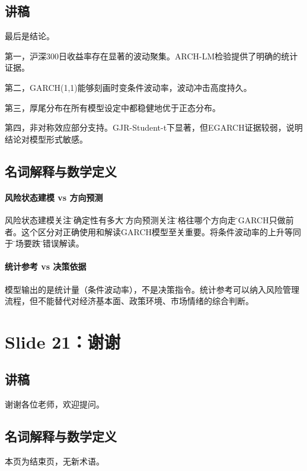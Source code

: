 \documentclass[11pt,a4paper]{article}
\begin{document}
\subsection*{讲稿}
最后是结论。

第一，沪深300日收益率存在显著的波动聚集。ARCH-LM检验提供了明确的统计证据。

第二，GARCH(1,1)能够刻画时变条件波动率，波动冲击高度持久。

第三，厚尾分布在所有模型设定中都稳健地优于正态分布。

第四，非对称效应部分支持。GJR-Student-t下显著，但EGARCH证据较弱，说明结论对模型形式敏感。

\subsection*{名词解释与数学定义}

\paragraph{风险状态建模 vs 方向预测} 风险状态建模关注\"不确定性有多大\"，方向预测关注\"价格往哪个方向走\"。GARCH只做前者。这个区分对正确使用和解读GARCH模型至关重要。将条件波动率的上升等同于\"市场要跌\"是错误解读。

\paragraph{统计参考 vs 决策依据} 模型输出的是统计量（条件波动率），不是决策指令。统计参考可以纳入风险管理流程，但不能替代对经济基本面、政策环境、市场情绪的综合判断。

\newpage
\section*{Slide 21：谢谢}

\subsection*{讲稿}
谢谢各位老师，欢迎提问。

\subsection*{名词解释与数学定义}
本页为结束页，无新术语。
\end{document}
